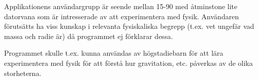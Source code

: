 Applikationens användargrupp är seende mellan 15-90 med åtminstone lite datorvana
som är intresserade av att experimentera med fysik. Användaren förutsätts ha
viss kunskap i relevanta fysiskaliska begrepp (t.ex. vet ungefär vad massa och
radie är) då programmet ej förklarar dessa.

Programmet skulle t.ex. kunna användas av högstadiebarn för att lära
experimentera med fysik för att förstå hur gravitation, etc. påverkas
av de olika storheterna.

